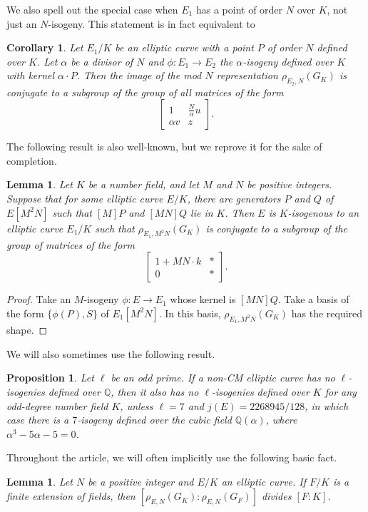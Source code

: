 \documentclass[10pt,leqno]{amsart}
\newcommand\m[1]{\begin{bmatrix}#1\end{bmatrix}}
\newcommand{\Q}{\mathbb{Q}}
\newtheorem{lemma}[theorem]{Lemma}
\newtheorem{proposition}[theorem]{Proposition}
\newtheorem{corollary}[theorem]{Corollary}
\theoremstyle{definition}
\theoremstyle{remark}
\numberwithin{theorem}{section}
\begin{document}
We also spell out the special case when $E_1$ has a point of order $N$ over $K$, not just an $N$-isogeny. This statement is in fact equivalent to \cite[Proposition 4.4]{bourdon-najman}

\begin{corollary}\label{slozeni}
    Let $E_1/K$ be an elliptic curve with a point $P$ of order $N$ defined over $K$. Let $\alpha$ be a divisor of $N$ and $\phi:E_1 \to E_2$ the  $\alpha$-isogeny defined over $K$ with kernel $\alpha\cdot P$. Then the image of the mod $N$ representation $\rho_{E_2, N}(G_K)$ is conjugate to a subgroup of the group of all matrices of the form $$\m{ 1 & \frac{N}{\alpha}u \\ \alpha v & z}.$$
\end{corollary}

The following result is also well-known, but we reprove it for the sake of completion.

\begin{lemma}\label{skok-s-izogenijom}
    Let $K$ be a number field, and let $M$ and $N$ be positive integers. Suppose that for some elliptic curve $E/K$, there are generators $P$ and $Q$ of $E[M^2N]$ such that $[M]P$ and $[MN]Q$ lie in $K$. Then $E$ is $K$-isogenous to an elliptic curve $E_1/K$ such that $\rho_{E_1, M^2N}(G_K)$ is conjugate to a subgroup of the group of matrices of the form $$\m{1+MN\cdot k & * \\ 0 & *}.$$
\end{lemma}
\begin{proof}
    Take an $M$-isogeny $\phi:E\to E_1$ whose kernel is $[MN]Q$. Take a basis of the form $\{\phi(P),S\}$ of $E_1[M^2N]$. In this basis, $\rho_{E_1, M^2N}(G_K)$ has the required shape.
\end{proof}


We will also sometimes use the following result.

\begin{proposition}\cite[Proposition 3.3.]{cremona-najman}\label{nadneparnimnistanovo}
    Let $\ell$ be an odd prime. If a non-CM elliptic curve has no $\ell$-isogenies defined over $\Q$, then it also has no $\ell$-isogenies defined over $K$ for any odd-degree number field $K$, unless $\ell=7$ and $j(E)=2268945/128$, in which case there is a $7$-isogeny defined over the cubic field $\Q(\alpha)$, where $\alpha^3-5\alpha-5=0$.
\end{proposition}

Throughout the article, we will often implicitly use the following basic fact.
\begin{lemma}
    Let $N$ be a positive integer and $E/K$ an elliptic curve. If $F/K$ is a finite extension of fields, then $[\rho_{E,N}(G_K):\rho_{E,N}(G_F)]$ divides $[F:K]$.
\end{lemma}
\end{document}
